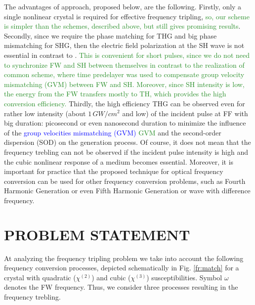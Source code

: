 \documentclass[a4paper, 12pt, onecolumn]{extarticle}
\begin{document}
The advantages of approach, proposed below, are the following. Firstly, only a single nonlinear crystal is required for effective frequency tripling, \textcolor{ForestGreen}{so, our scheme is simpler than the schemes, described above, but still gives promising results}. Secondly, since we require the phase matching for THG and big phase mismatching for SHG, then the electric field polarization at the SH wave is not essential in contrast to \cite{bib:t4}. \textcolor{ForestGreen}{This is convenient for short pulses, since we do not need to synchronize FW and SH between themselves in contrast to the realization of common scheme\cite{bib:t5}, where time predelayer was used to compensate group velocity mismatching (GVM) between FW and SH. Moreover, since SH intensity is low, the energy from the FW transfers mostly to TH, which provides the high conversion efficiency.} Thirdly, the high efficiency THG can be observed even for rather low intensity (about \(1\,GW/cm^2\) and low) of the incident pulse at FF with big duration: picosecond or even nanosecond duration to minimize the influence of the \textcolor{blue}{group velocities mismatching (GVM)} \textcolor{ForestGreen}{GVM} and the second-order dispersion (SOD) on the generation process. Of course, it does not mean that the frequency trebling can not be observed if the incident pulse intensity is high and the cubic nonlinear response of a medium becomes essential. Moreover, it is important for practice that the proposed technique for optical frequency conversion can be used for other frequency conversion problems, such as Fourth Harmonic Generation or even Fifth Harmonic Generation or wave with difference frequency. 

\section{PROBLEM STATEMENT}
At analyzing the frequency tripling problem we take into account the following frequency conversion processes, depicted schematically in Fig. \ref{fr:match} for a crystal with quadratic (\(\chi^{(2)}\)) and cubic (\(\chi^{(3)}\))  susceptibilities. Symbol \(\omega\) denotes the FW frequency. 
Thus, we consider three processes resulting in the frequency trebling.
\end{document}
